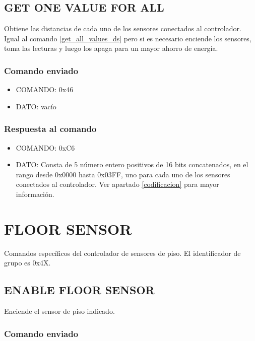 \documentclass[a4paper,10pt]{article}
\begin{document}
\subsection{GET ONE VALUE FOR ALL}
\label{get_one_value_for_all_ds}

Obtiene las distancias de cada uno de los sensores conectados al controlador.
Igual al comando \ref{get_all_values_ds} pero si es necesario enciende los sensores, toma las lecturas y luego los apaga para un mayor ahorro de energ\'ia.

\subsubsection*{Comando enviado}

\begin{itemize}
	\item{COMANDO:} 0x46
	\item{DATO:} vac\'io
\end{itemize}

\subsubsection*{Respuesta al comando}

\begin{itemize}
	\item{COMANDO:} 0xC6
	\item{DATO:} Consta de 5 n\'umero entero positivos de 16 bits concatenados, en el rango desde 0x0000 hasta 0x03FF,
		uno para cada uno de los sensores conectados al controlador.
		Ver apartado \ref{codificacion} para mayor informaci\'on.
\end{itemize}

\section{FLOOR SENSOR} 
\label{grupo_floor_sensor}

Comandos espec\'ificos del controlador de sensores de piso.
El identificador de grupo es 0x4X.

\subsection{ENABLE FLOOR SENSOR}
\label{enable_fs}

Enciende el sensor de piso indicado.

\subsubsection*{Comando enviado}
\end{document}
